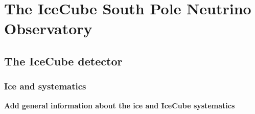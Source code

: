 \chapter{The IceCube South Pole Neutrino Observatory}\label{chapter:icecube}
\section{The IceCube detector}

\begingroup
\graphicspath{{results/HESE_Final_Paper/}}

\endgroup

\subsection{Ice and systematics}
\textbf{Add general information about the ice and IceCube systematics}
